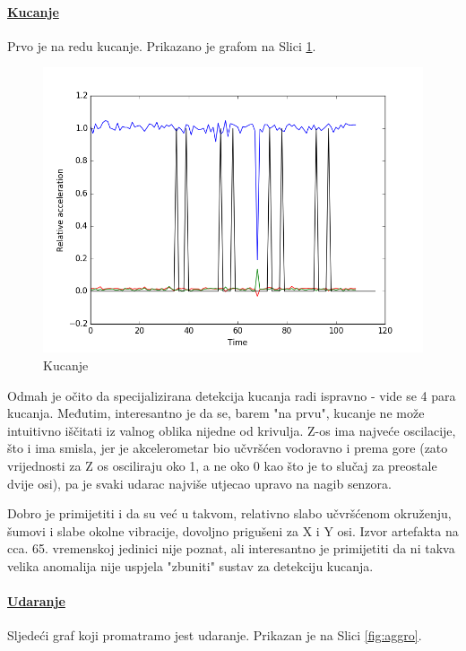 \documentclass[12pt,a4paper]{article}
\begin{document}
	\paragraph{\underline{Kucanje}} %
	\label{par:click}
	Prvo je na redu kucanje. Prikazano je grafom na Slici \ref{fig:click}.

	\begin{figure}[h!]
	  \includegraphics[width=\linewidth]{slike/click.png}
	  \caption{Kucanje}
	  \label{fig:click}
	\end{figure}

	Odmah je očito da specijalizirana detekcija kucanja radi ispravno - vide se 4 para kucanja. Međutim, interesantno je da se, barem "na prvu", kucanje ne može intuitivno iščitati iz valnog oblika nijedne od krivulja. Z-os ima najveće oscilacije, što i ima smisla, jer je akcelerometar bio učvršćen vodoravno i prema gore (zato vrijednosti za Z os osciliraju oko 1, a ne oko 0 kao što je to slučaj za preostale dvije osi), pa je svaki udarac najviše utjecao upravo na nagib senzora.
	\par Dobro je primijetiti i da su već u takvom, relativno slabo učvršćenom okruženju, šumovi i slabe okolne vibracije, dovoljno prigušeni za X i Y osi. Izvor artefakta na cca. 65. vremenskoj jedinici nije poznat, ali interesantno je primijetiti da ni takva velika anomalija nije uspjela "zbuniti" sustav za detekciju kucanja.

	\newpage
	\paragraph{\underline{Udaranje}} %
	\label{par:aggro}
	Sljedeći graf koji promatramo jest udaranje. Prikazan je na Slici \ref{fig:aggro}.
\end{document}
